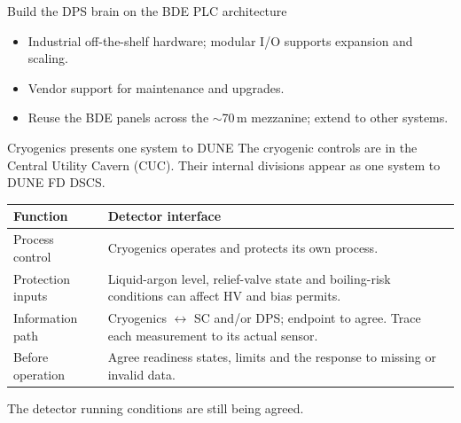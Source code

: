 \documentclass[aspectratio=169,11pt]{beamer}
\begin{document}
\begin{frame}{Build the DPS brain on the BDE PLC architecture}
\begin{itemize}
\item Industrial off-the-shelf hardware; modular I/O supports expansion and scaling.
\item Vendor support for maintenance and upgrades.
\item Reuse the BDE panels across the $\sim$70\,m mezzanine; extend to other systems.
\end{itemize}\par\medskip
\centering
{}\par\smallskip
\raggedright{}
\end{frame}

\begin{frame}{Cryogenics presents one system to DUNE}
The cryogenic controls are in the Central Utility Cavern (CUC).
Their internal divisions appear as one system to DUNE FD DSCS.\par\bigskip
\renewcommand{\arraystretch}{1.3}
\begin{tabularx}{\textwidth}{@{}>{\RaggedRight\arraybackslash}p{3cm}>{\RaggedRight\arraybackslash}X@{}}
\toprule
\textbf{Function} & \textbf{Detector interface}\\\midrule
Process control & Cryogenics operates and protects its own process.\\
Protection inputs & Liquid-argon level, relief-valve state and boiling-risk conditions can affect HV and bias permits.\\
Information path & Cryogenics $\leftrightarrow$ SC and/or DPS; endpoint to agree. Trace each measurement to its actual sensor.\\
Before operation & Agree readiness states, limits and the response to missing or invalid data.\\
\bottomrule
\end{tabularx}\par\medskip
The detector running conditions are still being agreed.
\end{frame}
\end{document}
